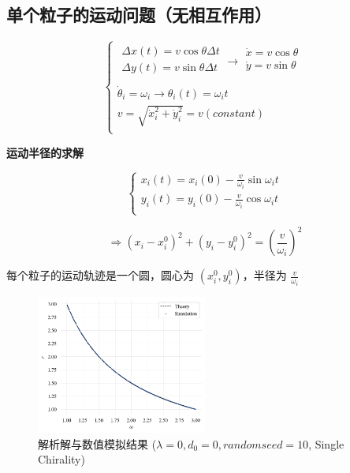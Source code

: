 \documentclass{article}
\begin{document}
\subsection{单个粒子的运动问题（无相互作用）}

$$
\begin{cases}
	\begin{array}{c}
	\Delta x\left( t \right) =v\cos \theta \Delta t\\
	\Delta y\left( t \right) =v\sin \theta \Delta t\\
\end{array}\rightarrow \begin{array}{c}
	\dot{x}=v\cos \theta\\
	\dot{y}=v\sin \theta\\
\end{array}\\
	\dot{\theta}_i=\omega _i\rightarrow \theta _i\left( t \right) =\omega _it\\
	v=\sqrt{\dot{x}_{i}^{2}+\dot{y}_{i}^{2}}=v\left( constant \right)\\
\end{cases}
$$

\textbf{运动半径的求解}

$$
\begin{cases}
	x_i\left( t \right) =x_i\left( 0 \right) -\frac{v}{\omega _i}\sin \omega _it\\
	y_i\left( t \right) =y_i\left( 0 \right) -\frac{v}{\omega _i}\cos \omega _it\\
\end{cases}
$$

$$
\Rightarrow \left( x_i-x_{i}^{0} \right) ^2+\left( y_i-y_{i}^{0} \right) ^2=\left( \frac{v}{\omega _i} \right) ^2
$$

每个粒子的运动轨迹是一个圆，圆心为 $\left( x_i^0,y_i^0 \right)$，半径为 $\frac{v}{\omega _i}$

\begin{figure}[H]
	\centering
	\includegraphics[width=0.5\textwidth]{./figs/noCouplingRadius.png}
	\caption{解析解与数值模拟结果 ($\lambda=0, d_0=0, random seed=10$, Single Chirality)}
	\label{fig:fig21.1}
\end{figure}
\end{document}
